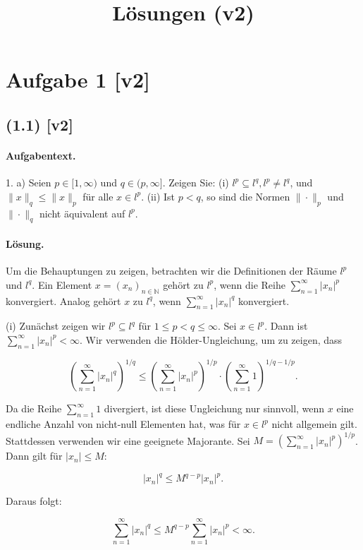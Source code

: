 \documentclass[11pt,a4paper]{article}
\title{Lösungen (v2)}
\date{}
\begin{document}
\maketitle

\section*{Aufgabe 1 [v2]}
\subsection*{(1.1) [v2]}
\paragraph{Aufgabentext.}
1. a) Seien $p \in[1, \infty)$ und $q \in(p, \infty]$. Zeigen Sie:
(i) $l^p \subseteq l^q, l^p \neq l^q$, und $\|x\|_q \leq\|x\|_p$ für alle $x \in l^p$.
(ii) Ist $p<q$, so sind die Normen $\|\cdot\|_p$ und $\|\cdot\|_q$ nicht äquivalent auf $l^p$.

\paragraph{Lösung.}
Um die Behauptungen zu zeigen, betrachten wir die Definitionen der Räume \( l^p \) und \( l^q \). Ein Element \( x = (x_n)_{n \in \mathbb{N}} \) gehört zu \( l^p \), wenn die Reihe \( \sum_{n=1}^{\infty} |x_n|^p \) konvergiert. Analog gehört \( x \) zu \( l^q \), wenn \( \sum_{n=1}^{\infty} |x_n|^q \) konvergiert.

(i) Zunächst zeigen wir \( l^p \subseteq l^q \) für \( 1 \leq p < q \leq \infty \). Sei \( x \in l^p \). Dann ist \( \sum_{n=1}^{\infty} |x_n|^p < \infty \). Wir verwenden die Hölder-Ungleichung, um zu zeigen, dass

\[
\left( \sum_{n=1}^{\infty} |x_n|^q \right)^{1/q} \leq \left( \sum_{n=1}^{\infty} |x_n|^p \right)^{1/p} \cdot \left( \sum_{n=1}^{\infty} 1 \right)^{1/q - 1/p}.
\]

Da die Reihe \( \sum_{n=1}^{\infty} 1 \) divergiert, ist diese Ungleichung nur sinnvoll, wenn \( x \) eine endliche Anzahl von nicht-null Elementen hat, was für \( x \in l^p \) nicht allgemein gilt. Stattdessen verwenden wir eine geeignete Majorante. Sei \( M = \left( \sum_{n=1}^{\infty} |x_n|^p \right)^{1/p} \). Dann gilt für \( |x_n| \leq M \):

\[
|x_n|^q \leq M^{q-p} |x_n|^p.
\]

Daraus folgt:

\[
\sum_{n=1}^{\infty} |x_n|^q \leq M^{q-p} \sum_{n=1}^{\infty} |x_n|^p < \infty.
\]
\end{document}
